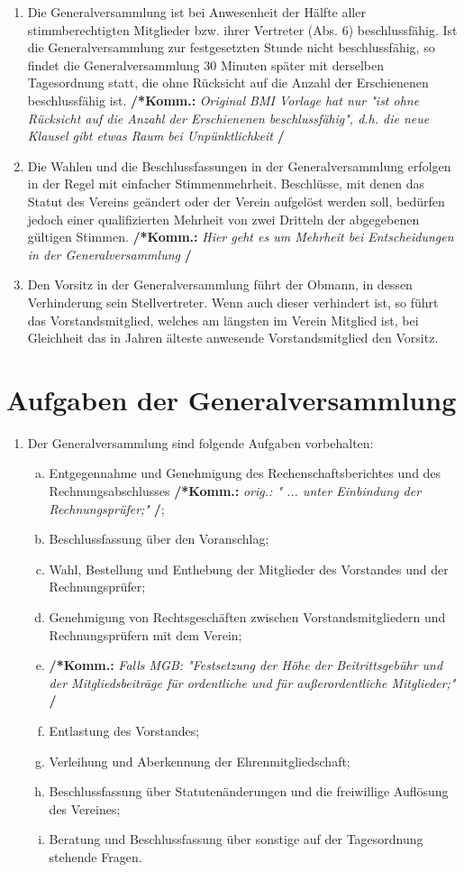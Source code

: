 \documentclass[a4paper,12pt]{article}
\newcommand{\comment}[1]{{\bf /*Komm.:} \textit{#1} {\bf */}}
\begin{document}
\begin{enumerate}
\item Die Generalversammlung ist bei Anwesenheit der Hälfte aller stimmberechtigten Mitglieder bzw. ihrer Vertreter (Abs. 6) beschlussfähig.
Ist die Generalversammlung zur festgesetzten Stunde nicht beschlussfähig, so findet die Generalversammlung 30 Minuten später mit derselben Tagesordnung statt, die ohne Rücksicht auf die Anzahl der Erschienenen beschlussfähig ist.
\comment{Original BMI Vorlage hat nur "ist ohne Rücksicht auf die Anzahl der Erschienenen beschlussfähig", d.h. die neue Klausel gibt etwas Raum bei Unpünktlichkeit}

\item Die Wahlen und die Beschlussfassungen in der Generalversammlung erfolgen in der Regel mit einfacher Stimmenmehrheit. Beschlüsse, mit denen das Statut des Vereins geändert oder der Verein aufgelöst werden soll, bedürfen jedoch einer qualifizierten Mehrheit von zwei Dritteln der abgegebenen gültigen Stimmen.
\comment{Hier geht es um Mehrheit bei Entscheidungen in der Generalversammlung}

\item Den Vorsitz in der Generalversammlung führt der Obmann, in dessen Verhinderung sein Stellvertreter. Wenn auch dieser verhindert ist, so führt das Vorstandsmitglied, welches am längsten im Verein Mitglied ist, bei Gleichheit das in Jahren älteste anwesende Vorstandsmitglied den Vorsitz.

\end{enumerate}

\section{Aufgaben der Generalversammlung} %
\begin{enumerate}
\item Der Generalversammlung sind folgende Aufgaben vorbehalten:
	\begin{enumerate}[(a)]
	\item Entgegennahme und Genehmigung des Rechenschaftsberichtes und des Rechnungsabschlusses \comment{orig.: " ... unter Einbindung der Rechnungsprüfer;"};
	\item Beschlussfassung über den Voranschlag;
	\item Wahl, Bestellung und Enthebung der Mitglieder des Vorstandes und der Rechnungsprüfer;
	\item Genehmigung von Rechtsgeschäften zwischen Vorstandsmitgliedern und Rechnungsprüfern mit dem Verein;
	\item \comment{Falls MGB: "Festsetzung der Höhe der Beitrittsgebühr und der Mitgliedsbeiträge für ordentliche und für außerordentliche Mitglieder;"}
	\item Entlastung des Vorstandes;
	\item Verleihung und Aberkennung der Ehrenmitgliedschaft;
	\item Beschlussfassung über Statutenänderungen und die freiwillige Auflösung des Vereines;
	\item Beratung und Beschlussfassung über sonstige auf der Tagesordnung stehende Fragen.
	\end{enumerate}
\end{enumerate}
\end{document}
